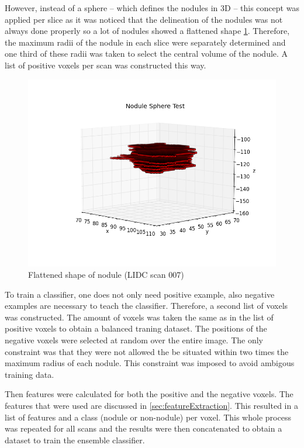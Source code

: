 However, instead of a sphere -- which defines the nodules in 3D -- this concept
was applied per slice as it was noticed that the delineation of the nodules was
not always done properly so a lot of nodules showed a flattened shape \ref{fig:flatNodule}.
Therefore, the maximum radii of the nodule in each slice were separately
determined and one third of these radii was taken to select the central volume
of the nodule. A list of positive voxels per scan was constructed this way.
\begin{figure}[htp] \begin{center}   \includegraphics[width=90
mm]{img/spherenodule_001.png}   \caption{Flattened shape of nodule (LIDC scan
007)}   \label{fig:flatNodule} \end{center} \end{figure}

To train a classifier, one does not only need positive example, also negative
examples are necessary to teach the classifier. Therefore, a second list of
voxels was constructed. The amount of voxels was taken the same as in the list
of positive voxels to obtain a balanced traning dataset. The positions of the
negative voxels were selected at random over the entire image. The only
constraint was that they were not allowed the be situated within two times the
maximum radius of each nodule. This constraint was imposed to avoid ambigous
training data.

Then features were calculated for both the positive and the negative voxels. The
features that were used are discussed in \ref{sec:featureExtraction}. This
resulted in a list of features and a class (nodule or non-nodule) per voxel.
This whole process was repeated for all scans and the results were then
concatenated to obtain a dataset to train the ensemble classifier.

